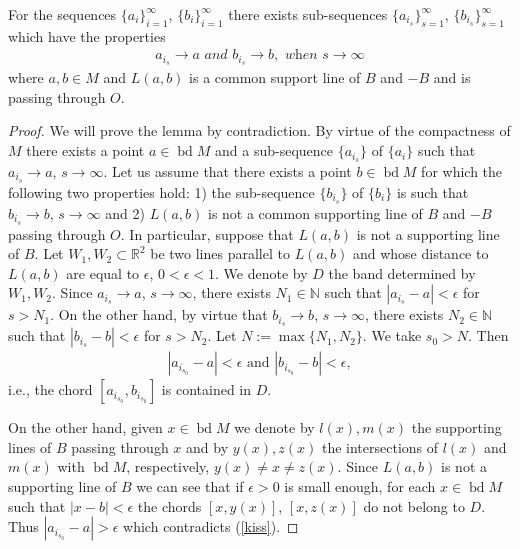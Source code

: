 \documentclass[10pt,a4paper]{amsart}
\newcommand{\Rd}{\mathbb{R}^2}
\newcommand{\bd}{\operatorname*{bd}}
\begin{document}
\begin{lemma}\label{star}
                For the sequences $\{a_i\}_{i=1} ^\infty$, $\{b_i\}_{i=1} ^\infty$ there 
                exists sub-sequences 
                $\{a_{i_s}\}_{s=1} ^\infty$, $\{b_{i_s}\}_{s=1} ^\infty$ which have the 
                properties  
\begin{eqnarray}\label{viri}
a_{i_s} \rightarrow a  \textit{ and } b_{i_s}\rightarrow b, \textit{ when } s\rightarrow \infty
\end{eqnarray} 
                where $a,b\in M$ and $L(a,b)$ is a common support line of $B$ 
                and $-B$ and is passing through $O$. 
\end{lemma}

\begin{proof}
             We will prove the lemma by contradiction. By virtue of the 
             compactness of $M$ there exists a point $a\in \bd M$ and a 
             sub-sequence $\{a_{i_s}\}$ of $\{a_i\}$ such that 
             $a_{i_s}\rightarrow a$, $s\rightarrow \infty$. Let us assume that 
             there exists a point $b\in \bd M$ for which the following two properties 
             hold: 1) the sub-sequence $\{b_{i_s}\}$ of $\{b_i\}$ is such that 
             $b_{i_s}\rightarrow b$, $s\rightarrow \infty$ and 2) $L(a,b)$ is not a 
             common supporting line of $B$ and $-B$ passing through $O$. In 
             particular, suppose that $L(a,b)$ is not a supporting line of $B$. Let 
             $W_1,W_2\subset \Rd$ be two lines parallel to $L(a,b)$ and whose 
             distance to $L(a,b) $ are equal to $\epsilon$, $0<\epsilon<1$. We 
             denote by $D$ the band determined by $W_1,W_2$. Since 
             $a_{i_s}\rightarrow a$, $s\rightarrow \infty$, there exists 
             $N_1\in \mathbb{N}$ such that $|a_{i_s} - a|<\epsilon$ for $s>N_1$. 
             On the other hand, by virtue that $b_{i_s}\rightarrow b$, 
             $s\rightarrow \infty$, there exists $N_2\in \mathbb{N}$ such that 
             $|b_{i_s} - b|<\epsilon$ for $s>N_2$. Let $N:=\max \{N_1,N_2\}$. 
             We take $s_0>N$. Then
\begin{eqnarray}\label{kiss}
             |a_{i_{s_0}}-a|<\epsilon \textrm{ and }|b_{i_{s_0}}-b|<\epsilon,
\end{eqnarray}
              i.e., the chord $[a_{i_{s_0}},b_{i_{s_0}}]$ is contained in $D$.
 
              On the other hand, given $x\in \bd M$ we denote by $l(x),m(x)$ the 
              supporting lines of $B$ passing through $x$ and by $y(x), z(x)$ the 
              intersections of $l(x)$ and $m(x)$ with $\bd M$, respectively, 
              $y(x)\not=x\not= z(x)$. Since $L(a,b)$ is not a supporting line of 
              $B$ we can see that if $\epsilon>0$ is small enough, for each 
              $x\in \bd M$ such that $|x-b|<\epsilon$ the chords $[x,y(x)]$, 
              $[x,z(x)]$ do not belong to $D$. Thus $|a_{i_{s_0}}-a|>\epsilon$ 
              which contradicts (\ref{kiss}).  


\end{proof}
\end{document}

